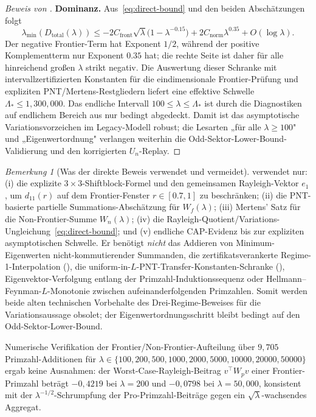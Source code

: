 ﻿\documentclass[12pt,a4paper]{article}
\theoremstyle{definition}
\theoremstyle{remark}
\newtheorem{remark}[theorem]{Bemerkung}
\begin{document}
\begin{proof}[Beweis von ]
\smallskip
\noindent\textbf{Dominanz.} Aus~\eqref{eq:direct-bound} und den beiden Abschätzungen folgt
\[
\lambda_{\min}(D_{\mathrm{total}}(\lambda))
\leq
-2 C_{\mathrm{front}}\sqrt{\lambda}\bigl(1-\lambda^{-0.15}\bigr)
+ 2 C_{\mathrm{norm}}\lambda^{0.35}
+ O(\log\lambda).
\]
Der negative Frontier-Term hat Exponent $1/2$, während der positive Komplementterm nur Exponent $0.35$ hat; die rechte Seite ist daher für alle hinreichend großen $\lambda$ strikt negativ. Die Auswertung dieser Schranke mit intervallzertifizierten Konstanten für die eindimensionale Frontier-Prüfung und expliziten PNT/Mertens-Restgliedern liefert eine effektive Schwelle $\Lambda_* \leq 1{,}300{,}000$. Das endliche Intervall $100\leq\lambda\leq\Lambda_*$ ist durch die Diagnostiken auf endlichem Bereich aus  nur bedingt abgedeckt. Damit ist das asymptotische Variationsvorzeichen im Legacy-Modell robust; die Lesarten „für alle $\lambda\geq100$" und „Eigenwertordnung" verlangen weiterhin die Odd-Sektor-Lower-Bound-Validierung und den korrigierten $U_n$-Replay.
\end{proof}

\begin{remark}[Was der direkte Beweis verwendet und vermeidet]
\label{rem:direct-proof-ingredients}
 verwendet nur: (i) die explizite $3\times3$-Shiftblock-Formel und den gemeinsamen Rayleigh-Vektor $e_1$, um $d_{11}(r)$ auf dem Frontier-Fenster $r\in[0.7,1]$ zu beschränken; (ii) die PNT-basierte partielle Summations-Abschätzung für $W_f(\lambda)$; (iii) Mertens' Satz für die Non-Frontier-Summe $W_n(\lambda)$; (iv) die Rayleigh-Quotient/Variations-Ungleichung~\eqref{eq:direct-bound}; und (v) endliche CAP-Evidenz bis zur expliziten asymptotischen Schwelle. Er benötigt \emph{nicht} das Addieren von Minimum-Eigenwerten nicht-kommutierender Summanden, die zertifikatsverankerte Regime-1-Interpolation (), die uniform-in-$L$-PNT-Transfer-Konstanten-Schranke (), Eigenvektor-Verfolgung entlang der Primzahl-Induktionssequenz oder Hellmann--Feynman-$L$-Monotonie zwischen aufeinanderfolgenden Primzahlen. Somit werden beide alten technischen Vorbehalte des Drei-Regime-Beweises für die Variationsaussage obsolet; der Eigenwertordnungsschritt bleibt bedingt auf den Odd-Sektor-Lower-Bound.

Numerische Verifikation der Frontier/Non-Frontier-Aufteilung über $9{,}705$ Primzahl-Additionen für $\lambda \in \{100, 200, 500, 1000, 2000, 5000, 10000, 20000, 50000\}$ ergab keine Ausnahmen: der Worst-Case-Rayleigh-Beitrag $v^\top W_{p} v$ einer Frontier-Primzahl beträgt $-0{,}4219$ bei $\lambda = 200$ und $-0{,}0798$ bei $\lambda = 50{,}000$, konsistent mit der $\lambda^{-1/2}$-Schrumpfung der Pro-Primzahl-Beiträge gegen ein $\sqrt{\lambda}$-wachsendes Aggregat.
\end{remark}
\end{document}

